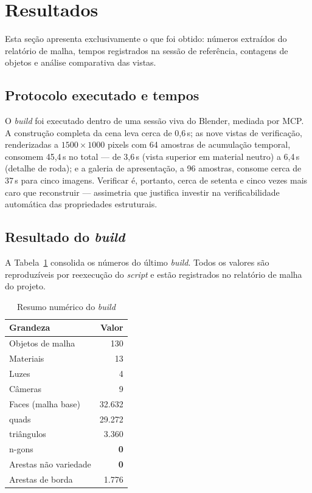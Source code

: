\section{Resultados}
\label{sec:resultados}

Esta se\c{c}\~ao apresenta exclusivamente o que foi obtido: n\'umeros extra\'idos do
relat\'orio de malha, tempos registrados na sess\~ao de refer\^encia, contagens de objetos e
an\'alise comparativa das vistas.

\subsection{Protocolo executado e tempos}

O \emph{build} foi executado dentro de uma sess\~ao viva do Blender, mediada por MCP. A
constru\c{c}\~ao completa da cena leva cerca de 0,6\,s; as nove vistas de
verifica\c{c}\~ao, renderizadas a $1500 \times 1000$ pixels com 64 amostras de
acumula\c{c}\~ao temporal, consomem 45,4\,s no total --- de 3,6\,s (vista superior em
material neutro) a 6,4\,s (detalhe de roda); e a galeria de apresenta\c{c}\~ao, a 96
amostras, consome cerca de 37\,s para cinco imagens. Verificar \'e, portanto, cerca de
setenta e cinco vezes mais caro que reconstruir --- assimetria que justifica investir na
verificabilidade autom\'atica das propriedades estruturais.

\subsection{Resultado do \emph{build}}

A Tabela~\ref{tab:build} consolida os n\'umeros do \'ultimo \emph{build}. Todos os valores
s\~ao reproduz\'iveis por reexecu\c{c}\~ao do \emph{script} e est\~ao registrados no
relat\'orio de malha do projeto.

\begin{table}[htbp]
\centering
\caption{Resumo num\'erico do \emph{build}}
\label{tab:build}
\footnotesize
\begin{tabular}{>{\raggedright\arraybackslash}p{7.2cm}r}
\toprule
\textbf{Grandeza} & \textbf{Valor} \\
\midrule
Objetos de malha & 130 \\
Materiais & 13 \\
Luzes & 4 \\
C\^ameras & 9 \\
Faces (malha base) & 32.632 \\
\quad quads & 29.272 \\
\quad tri\^angulos & 3.360 \\
\quad n-gons & \textbf{0} \\
Arestas n\~ao variedade & \textbf{0} \\
Arestas de borda & 1.776 \\
\bottomrule
\end{tabular}
\end{table}

